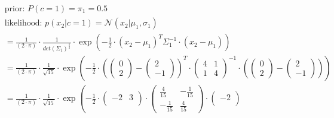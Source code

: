 \documentclass[12pt]{article}
\begin{document}
\begin{enumerate}
\begin{itemize}[label=]
            \begin{equation*}
                \begin{aligned}
                    &\text{prior: } P(c=1) = \pi_1 = \mathbf{0.5} \\
                    &\text{likelihood: } p(x_2|c=1) = \mathcal{N}(x_2| \mu_1, \sigma_1) \\
                    &= \frac{1}{(2 \cdot \pi)} \cdot \frac{1}{det(\Sigma_1)^\frac{1}{2}} \cdot \exp \left( -\frac{1}{2} \cdot (x_2 - \mu_1)^{T} \Sigma_1^{-1} \cdot (x_2 - \mu_1) \right)\\
                    &= \frac{1}{(2 \cdot \pi)} \cdot \frac{1}{\sqrt{15}} \cdot \exp \left( -\frac{1}{2} \cdot \left(\begin{pmatrix}
                    0\\
                    2
                    \end{pmatrix} - \begin{pmatrix}
                    2\\
                    -1
                    \end{pmatrix}\right)^{T} \cdot \begin{pmatrix}
                    4 & 1\\
                    1 & 4
                    \end{pmatrix}^{-1} \cdot \left(\begin{pmatrix}
                    0\\
                    2
                    \end{pmatrix} - \begin{pmatrix}
                    2\\
                    -1
                    \end{pmatrix}\right) \right)\\
                    &= \frac{1}{(2 \cdot \pi)} \cdot \frac{1}{\sqrt{15}} \cdot \exp \left( -\frac{1}{2} \cdot \begin{pmatrix}
                    -2 & 3\\
                    \end{pmatrix} \cdot \begin{pmatrix}
                    \frac{4}{15} & -\frac{1}{15}\\
                    -\frac{1}{15} & \frac{4}{15}
                    \end{pmatrix} \cdot \begin{pmatrix}
                    -2\\

\end{pmatrix}
\end{aligned}
\end{equation*}
\end{itemize}
\end{enumerate}
\end{document}
